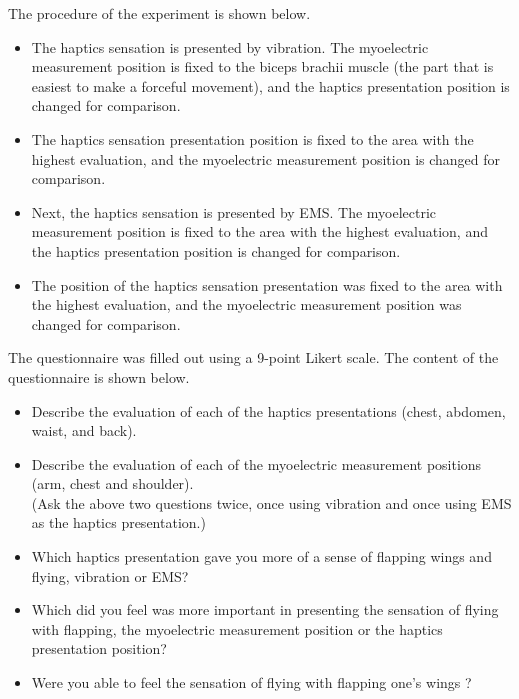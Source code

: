 \documentclass[letterpaper, 10 pt, conference]{ieeeconf}  %
\begin{document}
                The procedure of the experiment is shown below.  
                \begin{itemize}
                        \item The haptics sensation is presented by vibration. The myoelectric measurement position is fixed to the biceps brachii muscle (the part that is easiest to make a forceful movement), and the haptics presentation position is changed for comparison.
                        \item The haptics sensation presentation position is fixed to the area with the highest evaluation, and the myoelectric measurement position is changed for comparison.
                        \item Next, the haptics sensation is presented by EMS. The myoelectric measurement position is fixed to the area with the highest evaluation, and the haptics presentation position is changed for comparison.
                        \item The position of the haptics sensation presentation was fixed to the area with the highest evaluation, and the myoelectric measurement position was changed for comparison.
                \end{itemize}

                The questionnaire was filled out using a 9-point Likert scale. The content of the questionnaire is shown below. 
                \begin{itemize}
                        \item Describe the evaluation of each of the haptics presentations (chest, abdomen, waist, and back).
                        \item Describe the evaluation of each of the myoelectric measurement positions (arm, chest and shoulder).\\
                                (Ask the above two questions twice, once using vibration and once using EMS as the haptics presentation.)
                        \item Which haptics presentation gave you more of a sense of flapping wings and flying, vibration or EMS?
                        \item Which did you feel was more important in presenting the sensation of flying with flapping, the myoelectric measurement position or the haptics presentation position?
                        \item Were you able to feel the sensation of flying with flapping one's wings ?
                \end{itemize}
                
\end{document}
